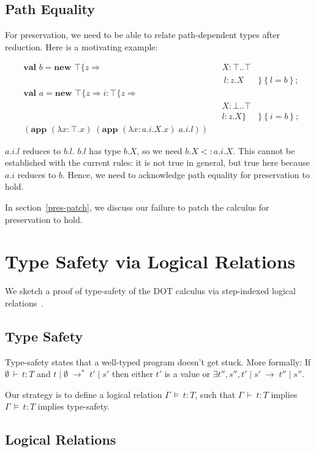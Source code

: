 \documentclass[9pt]{sigplanconf}
\newcommand{\ts}{\,\vdash\,}
\newcommand{\typ}{:}
\newcommand{\reduces}{\;\rightarrow\;}
\newcommand{\mlrefine}[2]{\{#1 \Rightarrow #2 \}}
\newcommand{\ldefs}[1]{\left\{#1\right\}}
\newcommand{\abs}[3]{\lambda #1\!:\!#2.#3}
\newcommand{\mlnew}[3]{\textbf{val }#1 = \textbf{new }#2 ;\;\\&#3}
\newcommand{\Ldecl}[3]{#1 : #2..#3}%
\newcommand{\ldecl}[2]{#1 : #2}
\newcommand{\Top}{\top}%
\newcommand{\Bot}{\bot}%
\newcommand{\reduction}[4]{#1 \operatorname{|} #2 \reduces #3 \operatorname{|} #4}
\newcommand{\app}[2]{(\textbf{app }#1\;#2)}
\newcommand{\reductionl}[5]{#1 \operatorname{|} #2 \;\rightarrow^{#5}\; #3 \operatorname{|} #4}
\newcommand{\ds}{\,\vDash\,}
\begin{document}
\subsection{Path Equality}\label{patheq}

For preservation, we need to be able to relate path-dependent types
after reduction. Here is a motivating example:

\begin{align*}
&\mlnew b {\Top \mlrefine z {&&\Ldecl X \Top \Top&\\
&&&\ \ldecl l {z.X}&}\ldefs{l = b}}{
\mlnew a {\Top \mlrefine z {\ldecl i {\Top \mlrefine z {&&&\\
&&&\Ldecl X \Bot \Top\\
&&&\ldecl l {z.X}}}&}\ldefs{i = b}}}{
\app {(\abs x \Top x)} {\app {(\abs x {a.i.X} x)} {a.i.l}}}
\end{align*}

$a.i.l$ reduces to $b.l$. $b.l$ has type $b.X$, so we need $b.X <:
a.i.X$. This cannot be established with the current rules: it is not
true in general, but true here because $a.i$ reduces to $b$. Hence,
we need to acknowledge path equality for preservation to hold.

In section~\ref{pres-patch}, we discuss our failure to patch the
calculus for preservation to hold.

\section{Type Safety via Logical Relations}\label{dot-type-safety}
We sketch a proof of type-safety of the DOT calculus via step-indexed
logical relations~\cite{ahmed04,ahmed06,step_indexed_obj}.

\subsection{Type Safety}
Type-safety states that a well-typed program doesn't get stuck. More
formally: If $\emptyset \ts t \typ T$ and $\reductionl t \emptyset {t'} {s'} *$ then
either $t'$ is a value or $\exists t'', s'', \reduction {t'} {s'}
{t''} {s''}$.

Our strategy is to define a logical relation $\Gamma \ds t : T$, such
that $\Gamma \ts t : T$ implies $\Gamma \ds t : T$ implies
type-safety.

\subsection{Logical Relations}
\end{document}
